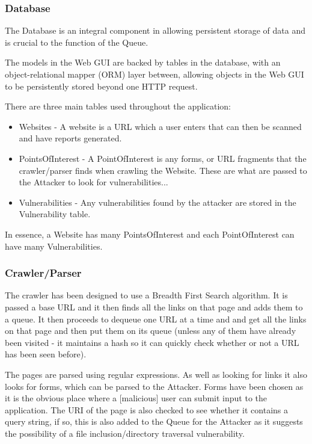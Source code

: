 \documentclass[12pt,a4paper]{article}
\begin{document}
\subsubsection{Database}
The Database is an integral component in allowing persistent storage of data and is crucial to the function of the Queue. 

The models in the Web GUI are backed by tables in the database, with an object-relational mapper (ORM) layer between, allowing objects in the Web GUI to be persistently stored beyond one HTTP request.

There are three main tables used throughout the application:

\begin{itemize}
    \item{Websites - A website is a URL which a user enters that can then be scanned and have reports generated.}
    \item{PointsOfInterest - A PointOfInterest is any forms, or URL fragments that the crawler/parser finds when crawling the Website.  These are what are passed to the Attacker to look for vulnerabilities...}
    \item{Vulnerabilities - Any vulnerabilities found by the attacker are stored in the Vulnerability table.}
\end{itemize}

In essence, a Website has many PointsOfInterest and each PointOfInterest can have many Vulnerabilities.

\subsubsection{Crawler/Parser}
The crawler has been designed to use a Breadth First Search algorithm.  It is passed a base URL and it then finds all the links on that page and adds them to a queue.  It then proceeds to dequeue one URL at a time and and get all the links on that page and then put them on its queue (unless any of them have already been visited - it maintains a hash so it can quickly check whether or not a URL has been seen before).

The pages are parsed using regular expressions.  As well as looking for links it also looks for forms, which can be parsed to the Attacker.  Forms have been chosen as it is the obvious place where a [malicious] user can submit input to the application.  The URI of the page is also checked to see whether it contains a query string, if so, this is also added to the Queue for the Attacker as it suggests the possibility of a file inclusion/directory traversal vulnerability.
\end{document}

